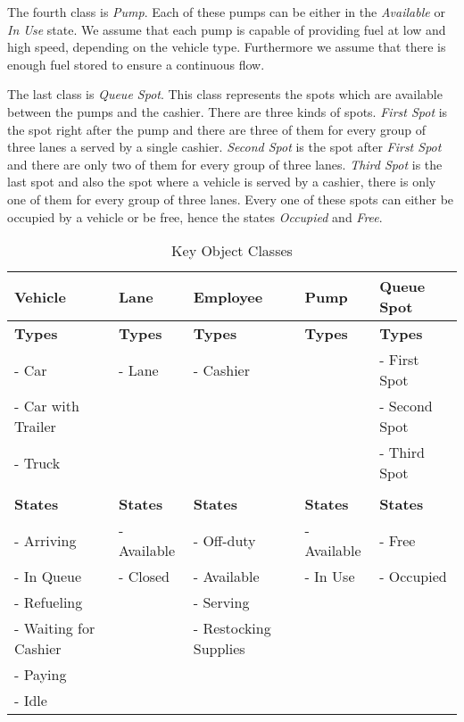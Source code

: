 The fourth class is \textit{Pump}.
Each of these pumps can be either in the \textit{Available} or \textit{In Use} state.
We assume that each pump is capable of providing fuel at low and high speed, depending on the vehicle type.
Furthermore we assume that there is enough fuel stored to ensure a continuous flow.

The last class is \textit{Queue Spot}. 
This class represents the spots which are available between the pumps and the cashier. 
There are three kinds of spots. 
\textit{First Spot} is the spot right after the pump and there are three of them for every group of three lanes a served by a single cashier.
\textit{Second  Spot} is the spot after \textit{First Spot} and there are only two of them for every group of three lanes. 
\textit{Third Spot} is the last spot and also the spot where a vehicle is served by a cashier, there is only one of them for every group of three lanes. 
Every one of these spots can either be occupied by a vehicle or be free, hence the states \textit{Occupied} and \textit{Free}.

\begin{center}
\begin{table}[h]
\begin{tabular}{| l | l | l | l | l |}
\hline
\textbf{Vehicle} & \textbf{Lane} & \textbf{Employee} & \textbf{Pump} & \textbf{Queue Spot}\\
\hline
\textbf{Types} & \textbf{Types} & \textbf{Types} & \textbf{Types} & \textbf{Types}\\
- Car & - Lane & - Cashier& & - First Spot\\
- Car with Trailer & & & & - Second Spot\\
- Truck & & & & - Third Spot\\
& & & & \\
\textbf{States} & \textbf{States} & \textbf{States} & \textbf{States} & \textbf{States}\\
- Arriving & - Available & - Off-duty & - Available & - Free\\
- In Queue & - Closed & - Available & - In Use & - Occupied\\
- Refueling & & - Serving & &\\
- Waiting for Cashier & & - Restocking Supplies & &\\
- Paying & & & &\\
- Idle & & & &\\
\hline
\end{tabular}
\caption{Key Object Classes}
\label{tab:koc}
\end{table}
\end{center}

